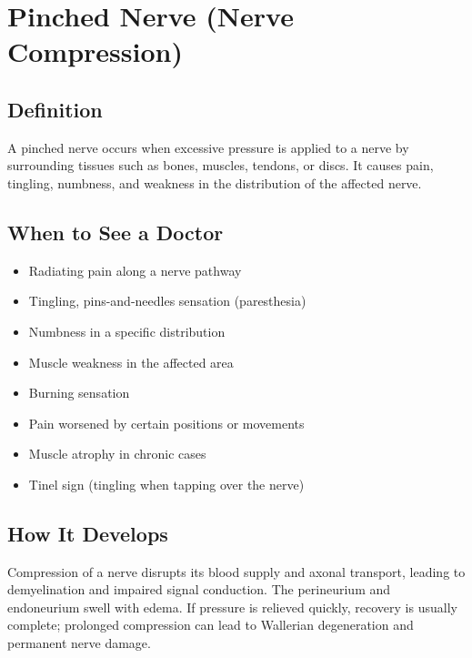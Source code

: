 \chapter{Pinched Nerve (Nerve Compression)}

\section*{Definition}
A pinched nerve occurs when excessive pressure is applied to a nerve by surrounding tissues such as bones, muscles, tendons, or discs. It causes pain, tingling, numbness, and weakness in the distribution of the affected nerve.

\section*{When to See a Doctor}
\begin{itemize}
\item Radiating pain along a nerve pathway
\item Tingling, pins-and-needles sensation (paresthesia)
\item Numbness in a specific distribution
\item Muscle weakness in the affected area
\item Burning sensation
\item Pain worsened by certain positions or movements
\item Muscle atrophy in chronic cases
\item Tinel sign (tingling when tapping over the nerve)
\end{itemize}

\section*{How It Develops}
Compression of a nerve disrupts its blood supply and axonal transport, leading to demyelination and impaired signal conduction. The perineurium and endoneurium swell with edema. If pressure is relieved quickly, recovery is usually complete; prolonged compression can lead to Wallerian degeneration and permanent nerve damage.

